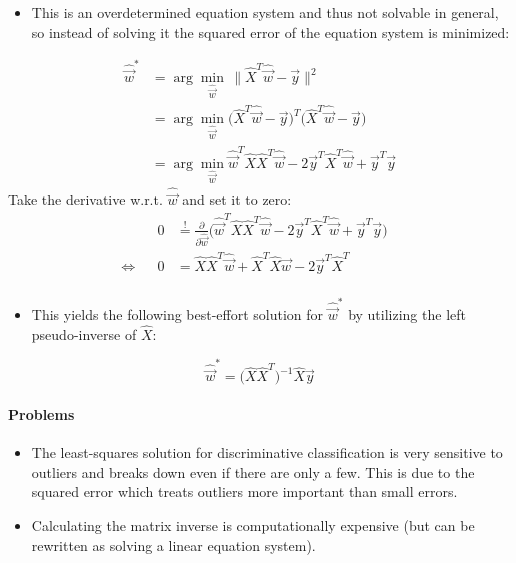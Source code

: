 			\begin{itemize}
				\item This is an overdetermined equation system and thus not solvable in general, so instead of solving it the squared error of the equation system is minimized:
			\end{itemize}
			\begin{align} %
				\hat{\vec{w}}^\ast & = \arg\min\limits_{\hat{\vec{w}}} \, \lVert \hat{X}^T \hat{\vec{w}} - \vec{y} \rVert^2                                                  \\
				                   & = \arg\min\limits_{\hat{\vec{w}}} \big( \hat{X}^T \hat{\vec{w}} - \vec{y} \big)^T \big( \hat{X}^T \hat{\vec{w}} - \vec{y} \big)         \\
				                   & = \arg\min\limits_{\hat{\vec{w}}} \hat{\vec{w}}^T \hat{X} \hat{X}^T \hat{\vec{w}} - 2\vec{y}^T\hat{X}^T\hat{\vec{w}} + \vec{y}^T\vec{y}
			\end{align}
			Take the derivative w.r.t. \( \hat{\vec{w}} \) and set it to zero:
			\begin{align}
				     &  & 0 & \overset{!}{=} \frac{\partial}{\partial \hat{\vec{w}}} \big( \hat{\vec{w}}^T \hat{X} \hat{X}^T \hat{\vec{w}} - 2\vec{y}^T\hat{X}^T\hat{\vec{w}} + \vec{y}^T\vec{y} \big) & \\
				\iff &  & 0 & = \hat{X} \hat{X}^T \hat{\vec{w}} + \hat{X}^T \hat{X} \hat{\vec{w}} - 2\vec{y}^T\hat{X}^T                                                                                & \\
			\end{align}
			\begin{itemize}
				\item This yields the following best-effort solution for \( \hat{\vec{w}}^\ast \) by utilizing the left pseudo-inverse of \(\hat{X}\):
			\end{itemize}
			\begin{equation}
				\hat{\vec{w}}^\ast = \big( \hat{X} \hat{X}^T \big)^{-1} \hat{X} \vec{y}
			\end{equation}

			\paragraph{Problems}
				\begin{itemize}
					\item The least-squares solution for discriminative classification is very sensitive to outliers and breaks down even if there are only a few. This is due to the squared error which treats outliers more important than small errors.
					\item Calculating the matrix inverse is computationally expensive (but can be rewritten as solving a linear equation system).
				\end{itemize}

